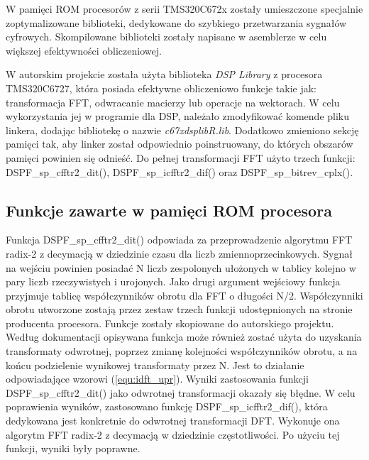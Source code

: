 
W pamięci ROM procesorów z serii TMS320C672x zostały umieszczone specjalnie zoptymalizowane biblioteki, dedykowane do szybkiego przetwarzania sygnałów cyfrowych. Skompilowane biblioteki zostały napisane w asemblerze w celu większej efektywności obliczeniowej. 

W autorskim projekcie została użyta biblioteka \emph{DSP Library} z procesora TMS320C6727, która posiada efektywne obliczeniowo funkcje takie jak: transformacja FFT, odwracanie macierzy lub operacje na wektorach. W celu wykorzystania jej w programie dla DSP, należało zmodyfikować komende pliku linkera, dodając bibliotekę o nazwie \emph{c67xdsplibR.lib}. Dodatkowo zmieniono sekcję pamięci tak, aby linker został odpowiednio poinstruowany, do których obszarów pamięci powinien się odnieść. Do pełnej transformacji FFT użyto trzech funkcji: DSPF\_sp\_cfftr2\_dit(), DSPF\_sp\_icfftr2\_dif() oraz DSPF\_sp\_bitrev\_cplx().

\subsection{Funkcje zawarte w pamięci ROM procesora}
Funkcja DSPF\_sp\_cfftr2\_dit() odpowiada za przeprowadzenie algorytmu FFT radix-2 z decymacją w dziedzinie czasu dla liczb zmiennoprzecinkowych. Sygnał na wejściu powinien posiadać N liczb zespolonych ułożonych w tablicy kolejno w pary liczb rzeczywistych i urojonych. Jako drugi argument wejściowy funkcja przyjmuje tablicę współczynników obrotu dla FFT o długości N/2. Współczynniki obrotu utworzone zostają przez zestaw trzech funkcji udostępnionych na stronie producenta procesora. Funkcje zostały skopiowane do autorskiego projektu. %
Według dokumentacji opisywana funkcja może również zostać użyta do uzyskania transformaty odwrotnej, poprzez zmianę kolejności współczynników obrotu, a na końcu podzielenie wynikowej transformaty przez N. Jest to działanie odpowiadające wzorowi (\ref{equ:idft_upr}). Wyniki zastosowania funkcji DSPF\_sp\_cfftr2\_dit() jako odwrotnej transformacji okazały się błędne. W celu poprawienia wyników, zastosowano funkcję DSPF\_sp\_icfftr2\_dif(), która dedykowana jest konkretnie do odwrotnej transformacji DFT. Wykonuje ona algorytm FFT radix-2 z decymacją w dziedzinie częstotliwości. Po użyciu tej funkcji, wyniki były poprawne.

